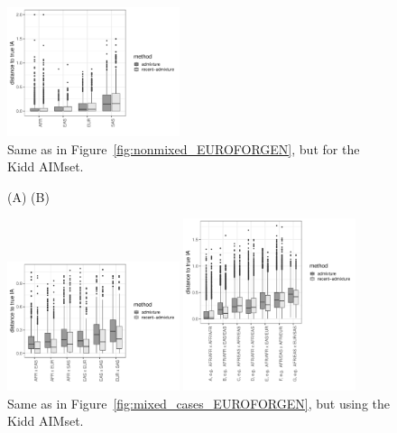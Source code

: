\documentclass[12pt]{article}
\theoremstyle{definition}
\begin{document}
\begin{figure}[H]
  \begin{center}
    \includegraphics[width=0.45\textwidth]{deviations_nonmixed_Kidd.pdf}
  \end{center}
  \caption{\label{fig:nonmixed_Kidd} Same as in
    Figure~\ref{fig:nonmixed_EUROFORGEN}, but for the Kidd AIMset.}
\end{figure}



\begin{figure}[H]
  \hspace{3cm} (A) \hspace{8cm} (B)
  \begin{center}
    \parbox[b]{0.45\textwidth}{\includegraphics[width=0.45\textwidth]{deviations_mixed_Kidd.pdf}\vspace{2cm}}
    \hspace{1cm}
    \parbox[b]{0.45\textwidth}{\includegraphics[width=0.45\textwidth]{deviations_mixed_cases_Kidd.pdf}}
  \end{center}
  \caption{\label{fig:mixed_cases_Kidd} Same as in
    Figure~\ref{fig:mixed_cases_EUROFORGEN}, but using the Kidd
    AIMset.}
\end{figure}
\end{document}
